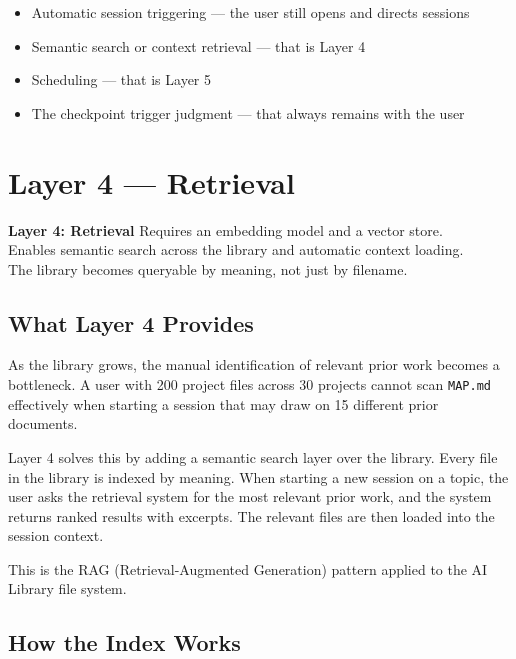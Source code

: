 \documentclass[12pt,letterpaper]{article}
\begin{document}
\begin{itemize}
  \item Automatic session triggering --- the user still opens and directs sessions
  \item Semantic search or context retrieval --- that is Layer 4
  \item Scheduling --- that is Layer 5
  \item The checkpoint trigger judgment --- that always remains with the user
\end{itemize}

\section{Layer 4 --- Retrieval}

\begin{layerbox4}
\textbf{Layer 4: Retrieval} \quad Requires an embedding model and a vector store.\\
Enables semantic search across the library and automatic context loading.\\
The library becomes queryable by meaning, not just by filename.
\end{layerbox4}

\subsection{What Layer 4 Provides}

As the library grows, the manual identification of relevant prior work
becomes a bottleneck. A user with 200 project files across 30 projects
cannot scan \texttt{MAP.md} effectively when starting a session that may
draw on 15 different prior documents.

Layer 4 solves this by adding a semantic search layer over the library.
Every file in the library is indexed by meaning. When starting a new
session on a topic, the user asks the retrieval system for the most
relevant prior work, and the system returns ranked results with excerpts.
The relevant files are then loaded into the session context.

This is the RAG (Retrieval-Augmented Generation) pattern applied to
the AI Library file system.

\subsection{How the Index Works}
\end{document}
